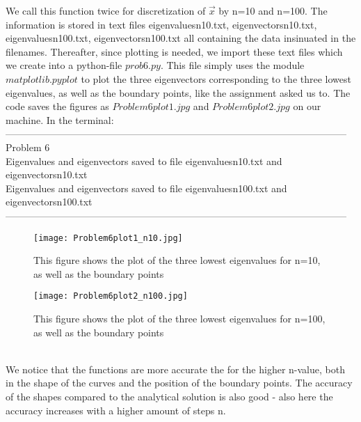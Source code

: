 \documentclass{article} %
\begin{document}
  We call this function twice for discretization of $\vec{x}$ by n=10 and n=100. The information is stored in text files eigenvaluesn10.txt, 
  eigenvectorsn10.txt, eigenvaluesn100.txt, eigenvectorsn100.txt all containing the data insinuated in the filenames. Thereafter, since plotting is needed, 
  we import these text files which we create into a python-file $prob6.py$. This file simply uses the module $matplotlib.pyplot$ to plot the 
  three eigenvectors corresponding to the three lowest eigenvalues, as well as the boundary points, like the assignment asked us to. 
  The code saves the figures as $Problem6plot1.jpg$ and $Problem6plot2.jpg$ on our machine.
  In the terminal: \\
  ---------------------------------------------------------------------------------------------------------
  Problem 6 \\
  Eigenvalues and eigenvectors saved to file eigenvaluesn10.txt and eigenvectorsn10.txt \\
  Eigenvalues and eigenvectors saved to file eigenvaluesn100.txt and eigenvectorsn100.txt \\
  --------------------------------------------------------------------------------------------------------- \\
  \begin{figure}[htb]
    \begin{center}
      \texttt{[image: Problem6plot1\_n10.jpg]}
      \caption{This figure shows the plot of the three lowest eigenvalues for n=10, as well as the boundary points}
    \end{center}
  \end{figure}
  \begin{figure}[htb]
    \begin{center}
      \texttt{[image: Problem6plot2\_n100.jpg]}
      \caption{This figure shows the plot of the three lowest eigenvalues for n=100, as well as the boundary points}
    \end{center}
  \end{figure}
  \\
  We notice that the functions are more accurate the for the higher n-value, both in the shape of the curves and the position
  of the boundary points. The accuracy of the shapes compared to the analytical solution is also good - also here the accuracy increases
  with a higher amount of steps n. 
\end{document}
